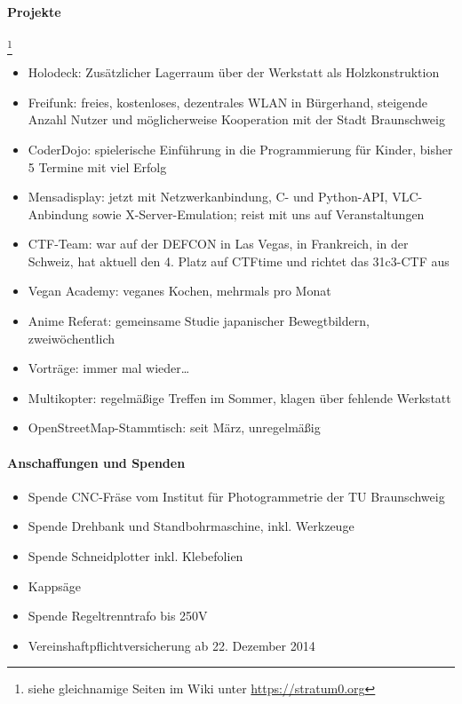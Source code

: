\documentclass[a4paper,12pt]{scrartcl}
\begin{document}
\paragraph{Projekte}\hspace{-2ex}\footnote{siehe gleichnamige Seiten im Wiki
unter \url{https://stratum0.org}}
\begin{itemize}
  \item Holodeck: Zusätzlicher Lagerraum über der Werkstatt als Holzkonstruktion
  \item Freifunk: freies, kostenloses, dezentrales WLAN in Bürgerhand, steigende
    Anzahl Nutzer und möglicherweise Kooperation mit der Stadt Braunschweig
  \item CoderDojo: spielerische Einführung in die Programmierung für Kinder,
    bisher 5 Termine mit viel Erfolg
  \item Mensadisplay: jetzt mit Netzwerkanbindung, C- und Python-API,
    VLC-Anbindung sowie X-Server-Emulation; reist mit uns auf Veranstaltungen
  \item CTF-Team: war auf der DEFCON in Las Vegas, in Frankreich, in der
    Schweiz, hat aktuell den 4. Platz auf CTFtime und richtet das 31c3-CTF
    aus
  \item Vegan Academy: veganes Kochen, mehrmals pro Monat
  \item Anime Referat: gemeinsame Studie japanischer Bewegtbildern,
    zweiwöchentlich
  \item Vorträge: immer mal wieder\ldots
  \item Multikopter: regelmäßige Treffen im Sommer, klagen über fehlende
    Werkstatt
  \item OpenStreetMap-Stammtisch: seit März, unregelmäßig
\end{itemize}

\paragraph{Anschaffungen und Spenden}
\begin{itemize}
  \item Spende CNC-Fräse vom Institut für Photogrammetrie der TU Braunschweig
  \item Spende Drehbank und Standbohrmaschine, inkl. Werkzeuge
  \item Spende Schneidplotter inkl. Klebefolien
  \item Kappsäge
  \item Spende Regeltrenntrafo bis 250V
  \item Vereinshaftpflichtversicherung ab 22. Dezember 2014
\end{itemize}
\end{document}
